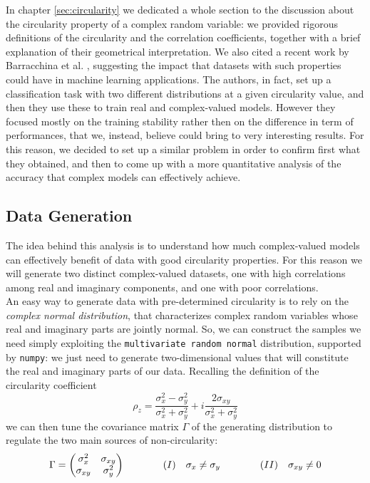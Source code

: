 \documentclass[../main.tex]{subfiles}
\begin{document}
In chapter \ref{sec:circularity} we dedicated a whole section to the discussion about the circularity property of a complex random variable: we provided rigorous definitions of the circularity and the correlation coefficients, together with a brief explanation of their geometrical interpretation. We also cited a recent work by Barracchina et al. \cite{barrachina2021complexvalued}, suggesting the impact that datasets with such properties could have in machine learning applications. The authors, in fact, set up a classification task with two different distributions at a given circularity value, and then they use these to train real and complex-valued models. However they focused mostly on the training stability rather then on the difference in term of performances, that we, instead, believe could bring to very interesting results. For this reason, we decided to set up a similar problem in order to confirm first what they obtained, and then to come up with a more quantitative analysis of the accuracy that complex models can effectively achieve.

\subsection*{Data Generation}

The idea behind this analysis is to understand how much complex-valued models can effectively benefit of data with good circularity properties. For this reason we will generate two distinct complex-valued datasets, one with high correlations among real and imaginary components, and one with poor correlations.\\
An easy way to generate data with pre-determined circularity is to rely on the \textit{complex normal distribution}, that characterizes complex random variables whose real and imaginary parts are jointly normal. So, we can construct the samples we need simply exploiting the \texttt{multivariate random normal} distribution, supported by \texttt{numpy}: we just need to generate two-dimensional values that will constitute the real and imaginary parts of our data. Recalling the definition of the circularity coefficient
\[ \rho_z = \frac{\sigma_x^2 - \sigma_y^2}{\sigma_x^2 + \sigma_y^2} + i\frac{2\sigma_{xy}}{\sigma_x^2 + \sigma_y^2} \]
we can then tune the covariance matrix $\Gamma$ of the generating distribution to regulate the two main sources of non-circularity:
\[ \Gamma=\mqty(\sigma_x^2 & \sigma_{xy} \\ \sigma_{xy} & \sigma_y^2) \qquad\qquad  (I)\quad\sigma_x\neq\sigma_y \qquad\qquad (II)\quad\sigma_{xy}\neq 0 \]
\end{document}
